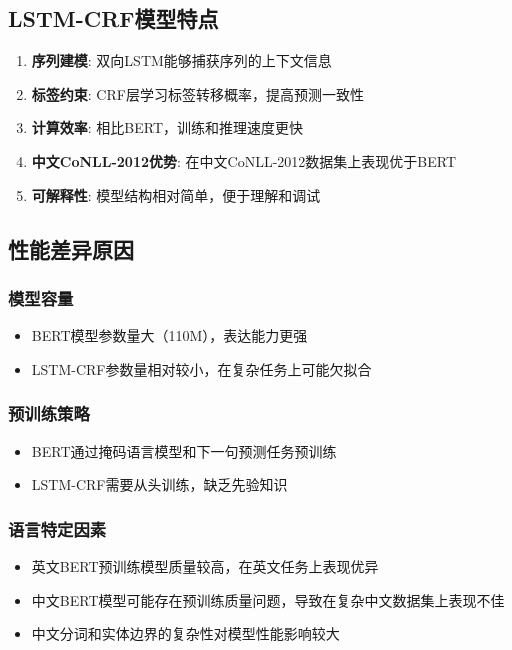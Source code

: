 \documentclass{article}
\begin{document}
\subsection{LSTM-CRF模型特点}

\begin{enumerate}
    \item \textbf{序列建模}: 双向LSTM能够捕获序列的上下文信息
    \item \textbf{标签约束}: CRF层学习标签转移概率，提高预测一致性
    \item \textbf{计算效率}: 相比BERT，训练和推理速度更快
    \item \textbf{中文CoNLL-2012优势}: 在中文CoNLL-2012数据集上表现优于BERT
    \item \textbf{可解释性}: 模型结构相对简单，便于理解和调试
\end{enumerate}

\subsection{性能差异原因}

\subsubsection{模型容量}
\begin{itemize}
    \item BERT模型参数量大（110M），表达能力更强
    \item LSTM-CRF参数量相对较小，在复杂任务上可能欠拟合
\end{itemize}

\subsubsection{预训练策略}
\begin{itemize}
    \item BERT通过掩码语言模型和下一句预测任务预训练
    \item LSTM-CRF需要从头训练，缺乏先验知识
\end{itemize}

\subsubsection{语言特定因素}
\begin{itemize}
    \item 英文BERT预训练模型质量较高，在英文任务上表现优异
    \item 中文BERT模型可能存在预训练质量问题，导致在复杂中文数据集上表现不佳
    \item 中文分词和实体边界的复杂性对模型性能影响较大
\end{itemize}
\end{document}
